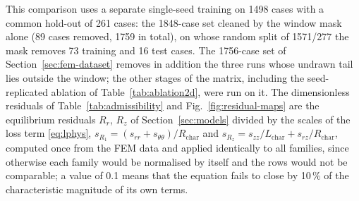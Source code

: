 This comparison uses a separate single-seed training on 1498 cases with a common hold-out of 261 cases: the 1848-case set cleaned by the window mask alone (89 cases removed, 1759 in total), on whose random split of 1571/277 the mask removes 73 training and 16 test cases. %
The 1756-case set of Section~\ref{sec:fem-dataset} removes in addition the three runs whose undrawn tail lies outside the window; the other stages of the matrix, including the seed-replicated ablation of Table~\ref{tab:ablation2d}, were run on it. %
The dimensionless residuals of Table~\ref{tab:admissibility} and Fig.~\ref{fig:residual-maps} are the equilibrium residuals $R_r$, $R_z$ of Section~\ref{sec:models} divided by the scales of the loss term \eqref{eq:lphys}, $s_{R_1}=(s_{rr}+s_{\theta\theta})/R_{\mathrm{char}}$ and $s_{R_z}=s_{zz}/L_{\mathrm{char}}+s_{rz}/R_{\mathrm{char}}$, computed once from the FEM data and applied identically to all families, since otherwise each family would be normalised by itself and the rows would not be comparable; a value of 0.1 means that the equation fails to close by 10\,\% of the characteristic magnitude of its own terms. %
